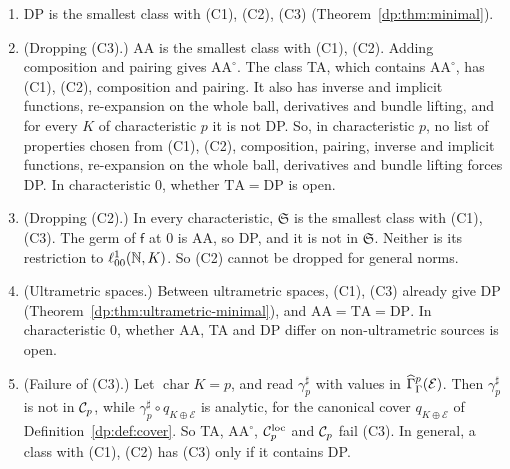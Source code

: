 \begin{theorem}\label{dp:thm:singles-out}
\leavevmode
\begin{enumerate}
\item DP is the smallest class with \textup{(C1), (C2), (C3)} (Theorem~\ref{dp:thm:minimal}).
\item \textup{(Dropping (C3).)} AA is the smallest class with \textup{(C1), (C2)}. Adding composition and pairing gives $\mathrm{AA}^\circ$. The class TA, which contains $\mathrm{AA}^\circ$, has \textup{(C1), (C2)}, composition and pairing. It also has inverse and implicit functions, re-expansion on the whole ball, derivatives and bundle lifting, and for every $K$ of characteristic $p$ it is not DP. So, in characteristic $p$, no list of properties chosen from \textup{(C1), (C2)}, composition, pairing, inverse and implicit functions, re-expansion on the whole ball, derivatives and bundle lifting forces DP. In characteristic $0$, whether $\mathrm{TA}=\mathrm{DP}$ is open.
\item \textup{(Dropping (C2).)} In every characteristic, $\mathfrak S$ is the smallest class with \textup{(C1), (C3)}. The germ of $\mathsf f$ at $0$ is AA, so DP, and it is not in $\mathfrak S$. Neither is its restriction to $\ell^1_{00}(\mathbb N,K)$. So \textup{(C2)} cannot be dropped for general norms.
\item \textup{(Ultrametric spaces.)} Between ultrametric spaces, \textup{(C1), (C3)} already give DP (Theorem~\ref{dp:thm:ultrametric-minimal}), and $\mathrm{AA}=\mathrm{TA}=\mathrm{DP}$. In characteristic $0$, whether AA, TA and DP differ on non-ultrametric sources is open.
\item \textup{(Failure of (C3).)} Let $\operatorname{char}K=p$, and read $\gamma^\sharp_p$ with values in $\widehat\Gamma^p_\Gamma(\mathcal E)$. Then $\gamma^\sharp_p$ is not in $\mathcal{C}_p$, while $\gamma^\sharp_p\circ q_{K\oplus\mathcal E}$ is analytic, for the canonical cover $q_{K\oplus\mathcal E}$ of Definition~\ref{dp:def:cover}. So TA, $\mathrm{AA}^\circ$, $\mathcal{C}_p^{\rm loc}$ and $\mathcal{C}_p$ fail \textup{(C3)}. In general, a class with \textup{(C1), (C2)} has \textup{(C3)} only if it contains DP.
\end{enumerate}
\end{theorem}

